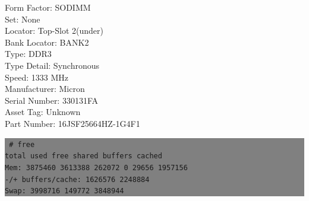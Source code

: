 \documentclass[12pt]{article}
\begin{document}
{{{{	Form Factor: SODIMM\\
	Set: None\\
	Locator: Top-Slot 2(under)\\
	Bank Locator: BANK2\\
	Type: DDR3\\
	Type Detail: Synchronous\\
	Speed: 1333 MHz\\
	Manufacturer: Micron\\
	Serial Number: 330131FA\\
	Asset Tag: Unknown\\
	Part Number: 16JSF25664HZ-1G4F1\\
}
} \vspace*{0.5cm} } } 

\colorbox{grey}{\parbox[t]{0.95\linewidth}{ \vspace*{0.5cm} { 
{\tt
\# free\\
             total       used       free     shared    buffers     cached\\
Mem:       3875460    3613388     262072          0      29656    1957156\\
-/+ buffers/cache:    1626576    2248884\\
Swap:      3998716     149772    3848944\\
}
} \vspace*{0.5cm} } } 
\end{document}
